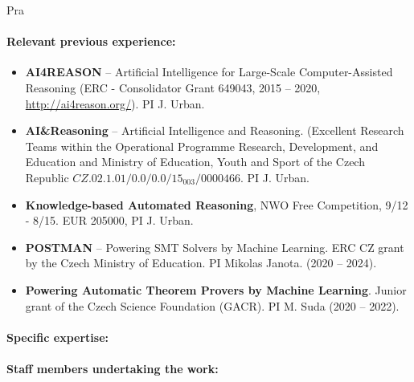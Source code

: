 \begin{sitedescription}{Pra}
\begin{compactitem}
\item{} 
\end{compactitem}


\paragraph{Relevant previous experience:}


\begin{itemize}
    \item \textbf{AI4REASON} -- Artificial Intelligence for Large-Scale Computer-Assisted Reasoning (ERC - Consolidator Grant 649043, 2015 -- 2020, \url{http://ai4reason.org/}). PI J. Urban.
    \item \textbf{AI\&Reasoning} -- Artificial Intelligence and Reasoning. (Excellent Research Teams within the Operational Programme Research, Development, and Education and Ministry of Education, Youth and Sport of the Czech Republic \begin{math}CZ.02.1.01/0.0/0.0/15_003/0000466\end{math}. PI J. Urban.
    \item \textbf{Knowledge-based Automated Reasoning}, NWO Free Competition, 9/12 - 8/15. EUR 205000, PI J. Urban.
    \item \textbf{POSTMAN} -- Powering SMT Solvers by Machine Learning. ERC CZ grant by the Czech Ministry of Education.  PI Mikolas Janota. (2020 -- 2024).
    \item \textbf{Powering Automatic Theorem Provers by Machine Learning}. Junior grant of the Czech Science Foundation (GACR). PI M. Suda (2020 -- 2022). 
    \end{itemize}


\paragraph{Specific expertise:}

\begin{compactitem}
\item {}
\end{compactitem}

\paragraph{Staff members undertaking the work:}


\end{sitedescription}

